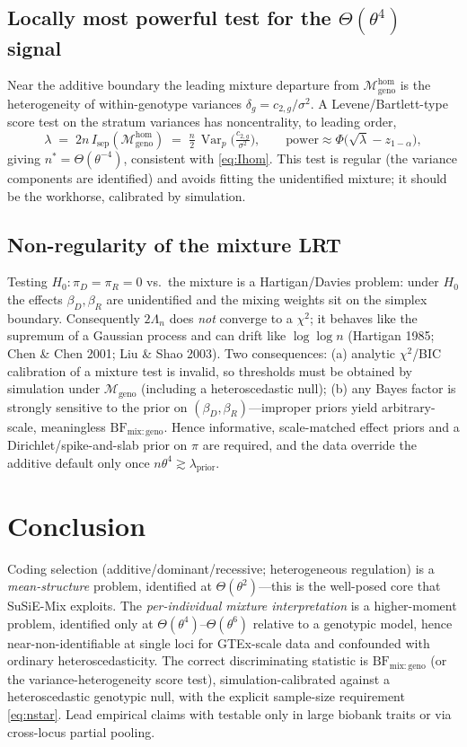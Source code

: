 \documentclass[11pt]{article}
\newcommand{\Var}{\operatorname{Var}}
\begin{document}
\subsection{Locally most powerful test for the $\Theta(\theta^4)$ signal}
Near the additive boundary the leading mixture departure from
$\mathcal M_{\mathrm{geno}}^{\mathrm{hom}}$ is the heterogeneity of
within-genotype variances $\delta_g=c_{2,g}/\sigma^2$. A Levene/Bartlett-type
score test on the stratum variances has noncentrality, to leading order,
\begin{equation}
\lambda \;=\; 2n\,I_{\mathrm{sep}}(\mathcal M_{\mathrm{geno}}^{\mathrm{hom}})
\;=\;\tfrac{n}{2}\,\Var_p\!\Big(\tfrac{c_{2,g}}{\sigma^2}\Big),
\qquad
\text{power}\approx\Phi\!\Big(\sqrt{\lambda}-z_{1-\alpha}\Big),
\end{equation}
giving $n^\ast=\Theta(\theta^{-4})$, consistent with \eqref{eq:Ihom}. This test
is regular (the variance components are identified) and avoids fitting the
unidentified mixture; it should be the workhorse, calibrated by simulation.

\subsection{Non-regularity of the mixture LRT}\label{sec:nonreg}
Testing $H_0:\pi_D=\pi_R=0$ vs.\ the mixture is a Hartigan/Davies problem: under
$H_0$ the effects $\beta_D,\beta_R$ are unidentified and the mixing weights sit on
the simplex boundary. Consequently $2\Lambda_n$ does \emph{not} converge to a
$\chi^2$; it behaves like the supremum of a Gaussian process and can drift like
$\log\log n$ (Hartigan 1985; Chen \& Chen 2001; Liu \& Shao 2003). Two
consequences: (a) analytic $\chi^2$/BIC calibration of a mixture test is invalid,
so thresholds must be obtained by simulation under $\mathcal M_{\mathrm{geno}}$
(including a heteroscedastic null); (b) any Bayes factor is strongly sensitive to
the prior on $(\beta_D,\beta_R)$---improper priors yield arbitrary-scale,
meaningless $\mathrm{BF}_{\mathrm{mix:geno}}$. Hence informative, scale-matched
effect priors and a Dirichlet/spike-and-slab prior on $\pi$ are required, and the
data override the additive default only once $n\theta^4\gtrsim\lambda_{\text{prior}}$.

\section{Conclusion}
Coding selection (additive/dominant/recessive; heterogeneous regulation) is a
\emph{mean-structure} problem, identified at $\Theta(\theta^2)$---this is the
well-posed core that SuSiE-Mix exploits. The \emph{per-individual mixture
interpretation} is a higher-moment problem, identified only at
$\Theta(\theta^4)$--$\Theta(\theta^6)$ relative to a genotypic model, hence
near-non-identifiable at single loci for GTEx-scale data and confounded with
ordinary heteroscedasticity. The correct discriminating statistic is
$\mathrm{BF}_{\mathrm{mix:geno}}$ (or the variance-heterogeneity score test),
simulation-calibrated against a heteroscedastic genotypic null, with the explicit
sample-size requirement \eqref{eq:nstar}. Lead empirical claims with
testable only in large biobank traits or via cross-locus partial pooling.
\end{document}

